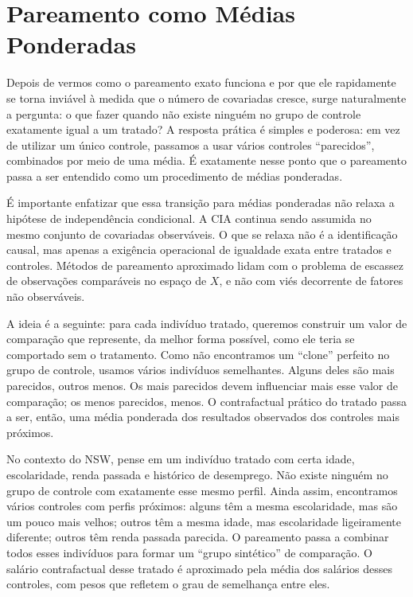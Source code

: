 \section{Pareamento como Médias Ponderadas}

Depois de vermos como o pareamento exato funciona e por que ele rapidamente se torna inviável à medida que o número de covariadas cresce, surge naturalmente a pergunta: o que fazer quando não existe ninguém no grupo de controle exatamente igual a um tratado? A resposta prática é simples e poderosa: em vez de utilizar um único controle, passamos a usar vários controles ``parecidos'', combinados por meio de uma média. É exatamente nesse ponto que o pareamento passa a ser entendido como um procedimento de médias ponderadas.

É importante enfatizar que essa transição para médias ponderadas não relaxa a hipótese de independência condicional. A CIA continua sendo assumida no mesmo conjunto de covariadas observáveis. O que se relaxa não é a identificação causal, mas apenas a exigência operacional de igualdade exata entre tratados e controles. Métodos de pareamento aproximado lidam com o problema de escassez de observações comparáveis no espaço de $X$, e não com viés decorrente de fatores não observáveis.

A ideia é a seguinte: para cada indivíduo tratado, queremos construir um valor de comparação que represente, da melhor forma possível, como ele teria se comportado sem o tratamento. Como não encontramos um “clone” perfeito no grupo de controle, usamos vários indivíduos semelhantes. Alguns deles são mais parecidos, outros menos. Os mais parecidos devem influenciar mais esse valor de comparação; os menos parecidos, menos. O contrafactual prático do tratado passa a ser, então, uma média ponderada dos resultados observados dos controles mais próximos.

No contexto do NSW, pense em um indivíduo tratado com certa idade, escolaridade, renda passada e histórico de desemprego. Não existe ninguém no grupo de controle com exatamente esse mesmo perfil. Ainda assim, encontramos vários controles com perfis próximos: alguns têm a mesma escolaridade, mas são um pouco mais velhos; outros têm a mesma idade, mas escolaridade ligeiramente diferente; outros têm renda passada parecida. O pareamento passa a combinar todos esses indivíduos para formar um “grupo sintético” de comparação. O salário contrafactual desse tratado é aproximado pela média dos salários desses controles, com pesos que refletem o grau de semelhança entre eles.

